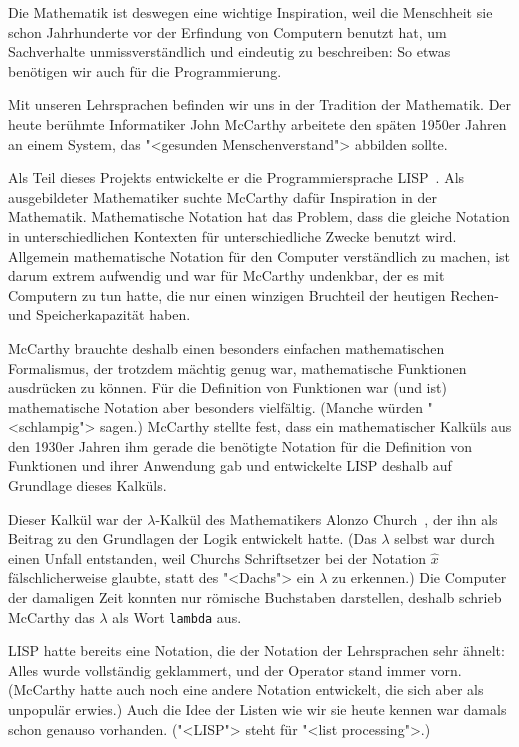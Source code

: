 Die Mathematik ist deswegen eine wichtige Inspiration, weil die
Menschheit sie schon Jahrhunderte vor der Erfindung von Computern
benutzt hat, um Sachverhalte unmissverständlich und eindeutig zu
beschreiben: So etwas benötigen wir auch für die Programmierung.

Mit unseren Lehrsprachen befinden wir uns in der Tradition der
Mathematik.  Der heute berühmte Informatiker John McCarthy arbeitete
den späten 1950er Jahren an einem System, das "<gesunden
Menschenverstand"> abbilden sollte.

Als Teil dieses Projekts entwickelte er die Programmiersprache
LISP~\cite{McCarthy1960}.  Als ausgebildeter Mathematiker suchte
McCarthy dafür Inspiration in der Mathematik.  Mathematische Notation
hat das Problem, dass die gleiche
Notation in unterschiedlichen Kontexten für unterschiedliche
Zwecke benutzt wird.  Allgemein mathematische Notation für den Computer
verständlich zu machen, ist darum extrem aufwendig und war für
McCarthy undenkbar, der es mit Computern zu tun hatte, die nur einen
winzigen Bruchteil der heutigen Rechen- und Speicherkapazität haben.

McCarthy brauchte deshalb einen besonders einfachen mathematischen
Formalismus, der trotzdem mächtig genug war, mathematische Funktionen
ausdrücken zu können.  Für die Definition von Funktionen war (und ist)
mathematische Notation aber besonders vielfältig.  (Manche würden
"<schlampig"> sagen.)  McCarthy stellte fest, dass ein
mathematischer Kalküls aus den 1930er Jahren ihm gerade die benötigte
Notation für die Definition von Funktionen und ihrer Anwendung gab
und entwickelte LISP deshalb auf Grundlage dieses Kalküls.

Dieser Kalkül war der $\lambda$-Kalkül des Mathematikers Alonzo
Church~\cite{Church1941}, der ihn als Beitrag zu den Grundlagen der
Logik entwickelt hatte.  (Das $\lambda$ selbst war durch einen Unfall
entstanden, weil Churchs Schriftsetzer bei der Notation $\hat{x}$
fälschlicherweise glaubte, statt des "<Dachs"> ein $\lambda$ zu
erkennen.)  Die Computer der damaligen Zeit konnten nur römische
Buchstaben darstellen, deshalb schrieb McCarthy das $\lambda$ als Wort
\lstinline{lambda} aus.

LISP hatte bereits eine Notation, die der Notation der Lehrsprachen
sehr ähnelt: Alles wurde vollständig geklammert, und der Operator
stand immer vorn.  (McCarthy hatte auch noch eine andere Notation
entwickelt, die sich aber als unpopulär erwies.)  Auch die Idee der
Listen wie wir sie heute kennen war damals schon genauso vorhanden.
("<LISP"> steht für "<list processing">.)

